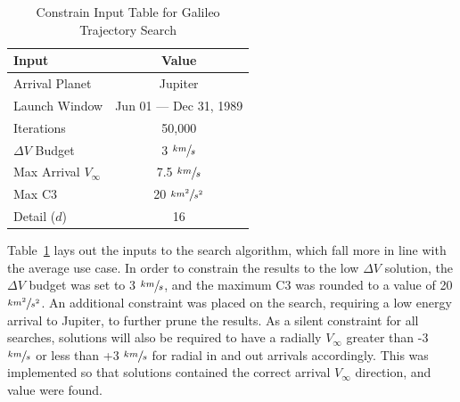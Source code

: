 \documentclass[letterpaper, preprint, paper,11pt]{AAS}	%
\begin{document}
\begin{table}[htb]
    \centering
    \caption{Constrain Input Table for Galileo Trajectory Search}
    \label{table:galiInputs}
    \begin{tabular}{lc}
        \toprule
        \textbf{Input} & \textbf{Value}\\
        \midrule
        Arrival Planet & Jupiter \\
        Launch Window & Jun 01 --- Dec 31, 1989 \\
        Iterations & 50,000 \\
        $\Delta V$ Budget & 3 $\sfrac{km}{s}$ \\
        Max Arrival $V_{\infty}$ & 7.5 $\sfrac{km}{s}$  \\
        Max C3 & 20 $\sfrac{km^2}{s^2}$ \\
        Detail ($d$) & 16 \\
        \bottomrule
    \end{tabular}
\end{table}

Table~\ref*{table:galiInputs} lays out the inputs to the search algorithm, which fall more in line with the average use case. In order to constrain the results to the low $\Delta V$ solution, the $\Delta V$ budget was set to 3 $\sfrac{km}{s}$, and the maximum C3 was rounded to a value of 20 $\sfrac{km^2}{s^2}$. An additional constraint was placed on the search, requiring a low energy arrival to Jupiter, to further prune the results. As a silent constraint for all searches, solutions will also be required to have a radially $V_\infty$ greater than -3 $\sfrac{km}{s}$ or less than +3 $\sfrac{km}{s}$ for radial in and out arrivals accordingly. This was implemented so that solutions contained the correct arrival $V_\infty$ direction, and value were found.
\end{document}
